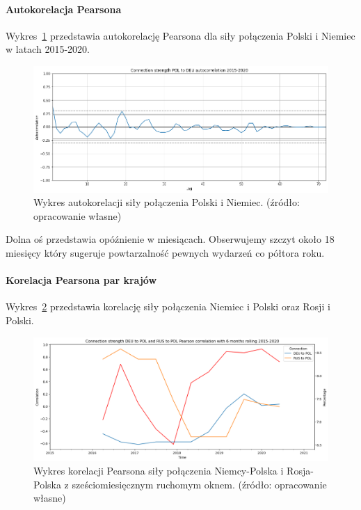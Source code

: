 \documentclass[11pt]{report}
\begin{document}
    \paragraph{Autokorelacja Pearsona}
    Wykres~\ref{fig:connection-strength-pol-to-deu-autocorrelation-2015-2020} przedstawia autokorelację Pearsona dla siły połączenia Polski i Niemiec w latach 2015-2020.

    \begin{figure}[!ht]
        \centering
        \includegraphics[width=\linewidth]{../spade_proto/figures/autocorrelation/Connection strength POL to DEU autocorrelation 2015-2020.png}
        \caption{Wykres autokorelacji siły połączenia Polski i Niemiec. (źródło: opracowanie własne)}
        \label{fig:connection-strength-pol-to-deu-autocorrelation-2015-2020}
    \end{figure}

    Dolna oś przedstawia opóźnienie w miesiącach.
    Obserwujemy szczyt około 18 miesięcy który sugeruje powtarzalność pewnych wydarzeń co półtora roku.

    \paragraph{Korelacja Pearsona par krajów}
    Wykres~\ref{fig:Connection strength DEU to POL and RUS to POL Pearson correlation with 6 months rolling 2015-2020} przedstawia korelację siły połączenia Niemiec i Polski oraz Rosji i Polski.

    \begin{figure}[!ht]
        \centering
        \includegraphics[width=\linewidth]{../spade_proto/figures/auto_seek/connection strength/pairwise_rolling_correlation/Connection strength DEU to POL and RUS to POL Pearson correlation with 6 months rolling 2015-2020.png}
        \caption{Wykres korelacji Pearsona siły połączenia Niemcy-Polska i Rosja-Polska z sześciomiesięcznym ruchomym oknem. (źródło: opracowanie własne)}
        \label{fig:Connection strength DEU to POL and RUS to POL Pearson correlation with 6 months rolling 2015-2020}
    \end{figure}
\end{document}
